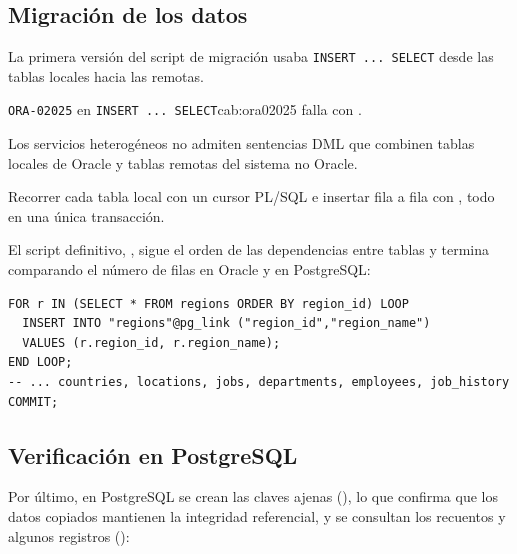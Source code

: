 \subsection{Migración de los datos}

La primera versión del script de migración usaba \texttt{INSERT ... SELECT} desde las tablas locales hacia las remotas.

\begin{cabezazo}{\texttt{ORA-02025} en \texttt{INSERT ... SELECT}}{cab:ora02025}
\problema {}
falla con .

\causa Los servicios heterogéneos no admiten sentencias DML que combinen
tablas locales de Oracle y tablas remotas del sistema no Oracle.

\solucion Recorrer cada tabla local con un cursor PL/SQL e insertar fila a
fila con , todo en una única transacción.
\end{cabezazo}

El script definitivo, , sigue el orden de las dependencias entre tablas y termina comparando el número de filas en Oracle y en PostgreSQL:

\begin{lstlisting}[style=sql]
FOR r IN (SELECT * FROM regions ORDER BY region_id) LOOP
  INSERT INTO "regions"@pg_link ("region_id","region_name")
  VALUES (r.region_id, r.region_name);
END LOOP;
-- ... countries, locations, jobs, departments, employees, job_history
COMMIT;
\end{lstlisting}


\subsection{Verificación en PostgreSQL}

Por último, en PostgreSQL se crean las claves ajenas (), lo que confirma que los datos copiados mantienen la integridad referencial, y se consultan los recuentos y algunos registros ():

